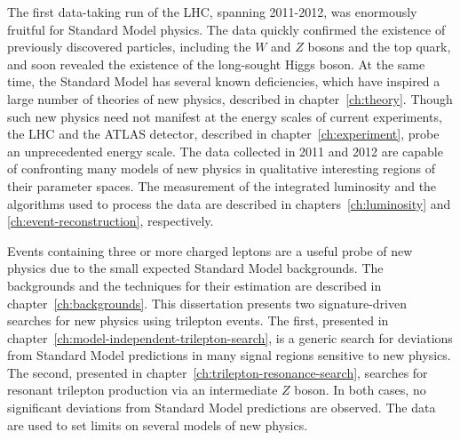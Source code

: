 The first data-taking run of the LHC, spanning 2011-2012, was enormously fruitful for Standard Model physics. The data quickly confirmed the existence of previously discovered particles, including the $W$ and $Z$ bosons and the top quark, and soon revealed the existence of the long-sought Higgs boson. At the same time, the Standard Model has several known deficiencies, which have inspired a large number of theories of new physics, described in chapter~\ref{ch:theory}. Though such new physics need not manifest at the energy scales of current experiments, the LHC and the ATLAS detector, described in chapter~\ref{ch:experiment}, probe an unprecedented energy scale. The data collected in 2011 and 2012 are capable of confronting many models of new physics in qualitative interesting regions of their parameter spaces. The measurement of the integrated luminosity and the algorithms used to process the data are described in chapters~\ref{ch:luminosity} and \ref{ch:event-reconstruction}, respectively. 

Events containing three or more charged leptons are a useful probe of new physics due to the small expected Standard Model backgrounds. The backgrounds and the techniques for their estimation are described in chapter~\ref{ch:backgrounds}.  This dissertation presents two signature-driven searches for new physics using trilepton events. The first, presented in chapter~\ref{ch:model-independent-trilepton-search}, is a generic search for deviations from Standard Model predictions in many signal regions sensitive to new physics. The second, presented in chapter~\ref{ch:trilepton-resonance-search}, searches for resonant trilepton production via an intermediate $Z$ boson. In both cases, no significant deviations from Standard Model predictions are observed. The data are used to set limits on several models of new physics. 
